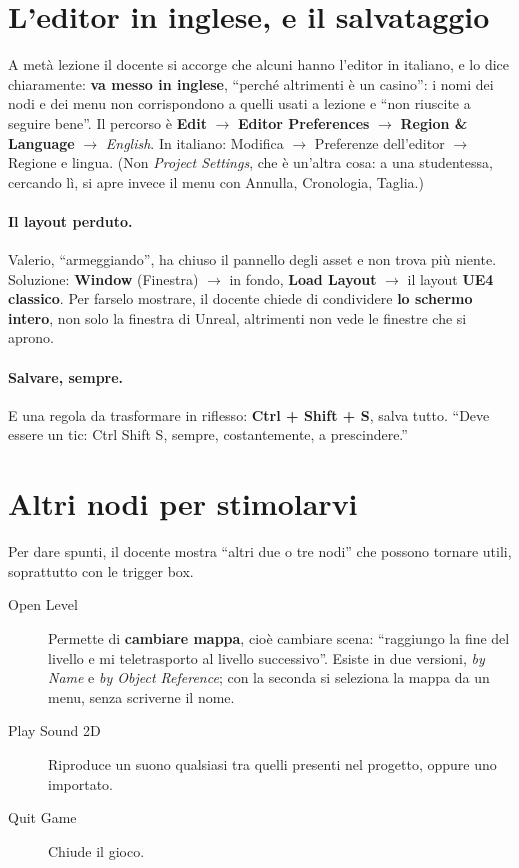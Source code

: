 \section{L'editor in inglese, e il salvataggio}
\label{gd7:sec:inglese}

A metà lezione il docente si accorge che alcuni hanno l'editor in italiano,
e lo dice chiaramente: \textbf{va messo in inglese}, ``perché altrimenti è un
casino'': i nomi dei nodi e dei menu non corrispondono a quelli usati a
lezione e ``non riuscite a seguire bene''. Il percorso è \textbf{Edit}
$\rightarrow$ \textbf{Editor Preferences} $\rightarrow$ \textbf{Region \&
Language} $\rightarrow$ \emph{English}. In italiano: Modifica $\rightarrow$
Preferenze dell'editor $\rightarrow$ Regione e lingua. (Non \emph{Project
Settings}, che è un'altra cosa: a una studentessa, cercando lì, si apre
invece il menu con Annulla, Cronologia, Taglia.)

\paragraph{Il layout perduto.} Valerio, ``armeggiando'', ha chiuso il pannello
degli asset e non trova più niente. Soluzione: \textbf{Window} (Finestra)
$\rightarrow$ in fondo, \textbf{Load Layout} $\rightarrow$ il layout
\textbf{UE4 classico}. Per farselo mostrare, il docente chiede di condividere
\textbf{lo schermo intero}, non solo la finestra di Unreal, altrimenti non
vede le finestre che si aprono.

\paragraph{Salvare, sempre.} E una regola da trasformare in riflesso:
\textbf{Ctrl + Shift + S}, salva tutto. ``Deve essere un tic: Ctrl Shift S,
sempre, costantemente, a prescindere.''

\section{Altri nodi per stimolarvi}
\label{gd7:sec:altri-nodi}

Per dare spunti, il docente mostra ``altri due o tre nodi'' che possono
tornare utili, soprattutto con le trigger box.
\begin{description}
  \item[Open Level] Permette di \textbf{cambiare mappa}, cioè cambiare scena:
        ``raggiungo la fine del livello e mi teletrasporto al livello
        successivo''. Esiste in due versioni, \emph{by Name} e \emph{by
        Object Reference}; con la seconda si seleziona la mappa da un menu,
        senza scriverne il nome.
  \item[Play Sound 2D] Riproduce un suono qualsiasi tra quelli presenti nel
        progetto, oppure uno importato.
  \item[Quit Game] Chiude il gioco.
\end{description}

